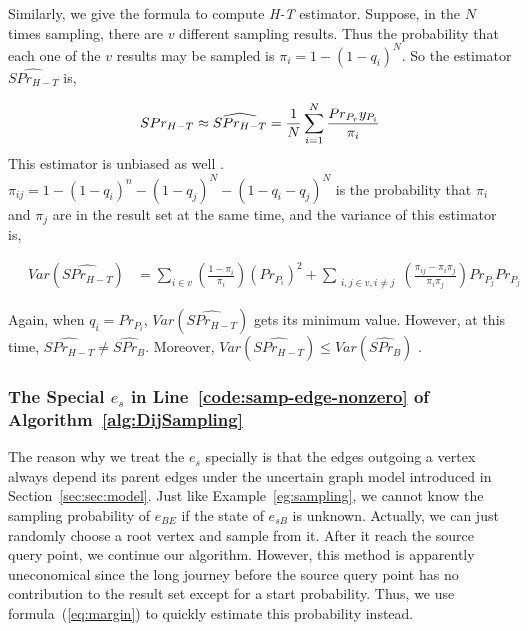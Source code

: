 \documentclass[runningheads,a4paper]{llncs}
\begin{document}
Similarly, we give the formula to compute \emph{H-T} estimator. Suppose, in the $N$ times sampling, there are $v$ different sampling results. Thus the probability that each one of the $v$ results may be sampled is $\pi_i=1-(1-q_i)^N$. So the estimator $\widehat{SPr_{H-T}}$ is,

\vspace{-0.1cm}
\begin{equation}
  \label{eq:SPrHT}
  SPr_{H-T}\approx\widehat{SPr_{H-T}}=\frac{1}{N}\sum_{i=1}^N\frac{Pr_{P_r} y_{P_i}}{\pi_i}
\vspace{-0.1cm}
\end{equation}
This estimator is unbiased as well \cite{jin2011distance}\cite{Sampling3rd}. $\pi_{ij}=1-(1-q_i)^n-(1-q_j)^N-(1-q_i-q_j)^N$ is the probability that $\pi_i$ and $\pi_j$ are in the result set at the same time, and the variance of this estimator is,

\vspace{-0.2cm}
\begin{eqnarray}
\label{eq:VarSPrHT}
  \ & Var(\widehat{SPr_{H-T}}) & = \sum_{i\in v}(\frac{1-\pi_i}{\pi_i})(Pr_{P_i})^2 +\sum_{\substack{i,j\in v, i\neq j}}(\frac{\pi_{ij}-\pi_i\pi_j}{\pi_i\pi_j})Pr_{P_j} Pr_{P_j}
\end{eqnarray}

\vspace{-0.2cm}
Again, when $q_i=Pr_{P_i}$, $Var(\widehat{SPr_{H-T}})$ gets its minimum value. However, at this time, $\widehat{SPr_{H-T}}\neq\widehat{SPr_B}$. Moreover, $Var(\widehat{SPr_{H-T}})\leq Var(\widehat{SPr_B})$ \cite{jin2011distance}.

\vspace{-0.2cm}
\subsubsection{The Special $e_s$ in Line~\ref{code:samp-edge-nonzero} of Algorithm~\ref{alg:DijSampling}}

The reason why we treat the $e_s$ specially is that the edges outgoing a vertex always depend its parent edges under the uncertain graph model introduced in Section~\ref{sec:sec:model}. Just like Example~\ref{eg:sampling}, we cannot know the sampling probability of $e_{BE}$ if the state of $e_{sB}$ is unknown. Actually, we can just randomly choose a root vertex and sample from it. After it reach the source query point, we continue our algorithm. However, this method is apparently uneconomical since the long journey before the source query point has no contribution to the result set except for a start probability. Thus, we use formula~(\ref{eq:margin}) to quickly estimate this probability instead.
\end{document}
